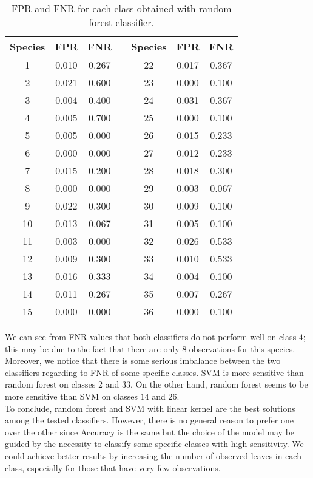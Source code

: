\documentclass{article}
\begin{document}
\begin{table}[h]
\begin{minipage}[]{7cm}
\end{minipage}
\hfill
\begin{minipage}[]{7cm}
\begin{tabular}{ |c|c|c|c|c|c|c| } \hline
Species & FPR & FNR & & Species & FPR & FNR \\
\hline
1 & 0.010 & 0.267 & & 22 & 0.017 & 0.367 \\ 
\hline
2 & 0.021 & 0.600 & & 23 & 0.000 & 0.100\\ 
\hline
 3 & 0.004 & 0.400 & & 24 & 0.031 & 0.367 \\ 
\hline
 4 & 0.005 & 0.700 & & 25 & 0.000 & 0.100\\ 
\hline
 5 &  0.005 & 0.000 & & 26 & 0.015 & 0.233 \\ 
\hline
 6 & 0.000 & 0.000 & & 27 & 0.012 & 0.233 \\ 
\hline
 7 & 0.015 & 0.200 & & 28 & 0.018 & 0.300\\ 
\hline
 8 & 0.000 & 0.000 & & 29 & 0.003 & 0.067\\ 
\hline
 9 & 0.022 & 0.300 & & 30 & 0.009& 0.100\\ 
\hline
 10 & 0.013 & 0.067 & & 31 &  0.005 & 0.100\\ 
\hline
 11 & 0.003 & 0.000 & & 32 & 0.026 & 0.533\\ 
\hline
 12 & 0.009 & 0.300 & & 33 & 0.010 & 0.533\\ 
\hline
 13 & 0.016 & 0.333 & & 34 & 0.004 & 0.100\\ 
\hline
 14 & 0.011 & 0.267 & & 35 & 0.007 & 0.267\\ 
\hline
 15 & 0.000 & 0.000 & & 36 & 0.000 & 0.100\\ 
\hline
\end{tabular}
\caption{FPR and FNR for each class obtained with random forest classifier.}\label{table4}
\end{minipage}

\end{table}

We can see from FNR values that both classifiers do not perform well on class $4$; this may be due to the fact that there are only $8$ observations for this species. Moreover, we notice that there is some serious imbalance between the two classifiers regarding to FNR of some specific classes. SVM is more sensitive than random forest on classes $2$ and $33$. On the other hand, random forest seems to be more sensitive than SVM on classes $14$ and $26$. %
\\To conclude, random forest and SVM with linear kernel are the best solutions among the tested classifiers. However, there is no general reason to prefer one over the other since Accuracy is the same but the choice of the model may be guided by the necessity to classify some specific classes with high sensitivity.
We could achieve better results by increasing the number of observed leaves in each class, especially for those that have very few observations.


\newpage


\end{document}

